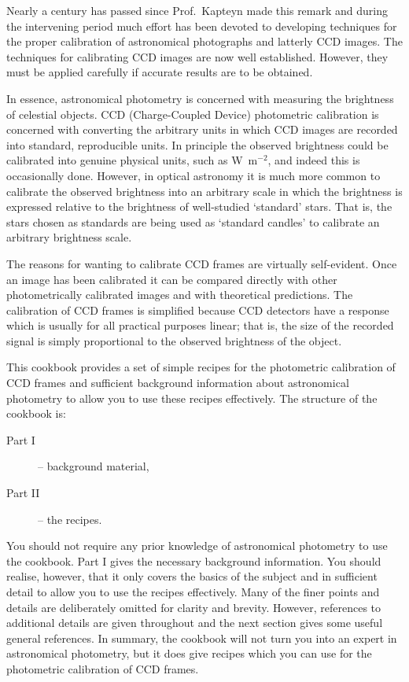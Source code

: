 \documentclass[twoside,11pt,nolof]{starlink}
\begin{document}
Nearly a century has passed since Prof.~Kapteyn made this remark and
during the intervening period much effort has been devoted to
developing techniques for the proper calibration of astronomical
photographs and latterly CCD images.  The techniques for calibrating
CCD images are now well established.  However, they must be applied
carefully if accurate results are to be obtained.

In essence, astronomical photometry is concerned with measuring the
brightness of celestial objects.  CCD (Charge-Coupled Device) photometric
calibration is concerned with converting the arbitrary units in which CCD
images are recorded into standard, reproducible units.  In principle the
observed brightness could be calibrated into genuine physical units,
such as W~m$^{-2}$, and indeed this is occasionally done.  However, in
optical astronomy it is much more common to calibrate the observed
brightness into an arbitrary scale in which the brightness is
expressed relative to the brightness of well-studied `standard' stars.
That is, the stars chosen as standards are being used as `standard
candles' to calibrate an arbitrary brightness scale.

The reasons for wanting to calibrate CCD frames are virtually
self-evident.  Once an image has been calibrated it can be compared
directly with other photometrically calibrated images and with theoretical
predictions.  The calibration of CCD frames is simplified because CCD
detectors have a response which is usually for all practical purposes
linear; that is, the size of the recorded signal is simply proportional
to the observed brightness of the object.

This cookbook provides a set of simple recipes for the photometric
calibration of CCD frames and sufficient background information about
astronomical photometry to allow you to use these recipes effectively.
The structure of the cookbook is:

\begin{description}

  \item[{\rm Part I}] -- background material,

  \item[{\rm Part II}] -- the recipes.

\end{description}

You should not require any prior knowledge of astronomical photometry
to use the cookbook.  Part I gives the necessary background information.
You should realise, however, that it only covers the basics of the
subject and in sufficient detail to allow you to use the recipes
effectively.  Many of the finer points and details are deliberately
omitted for clarity and brevity.  However, references to additional
details are given throughout and the next section gives some useful
general references.  In summary, the cookbook will not turn you into
an expert in astronomical photometry, but it does give recipes which
you can use for the photometric calibration of CCD frames.
\end{document}
